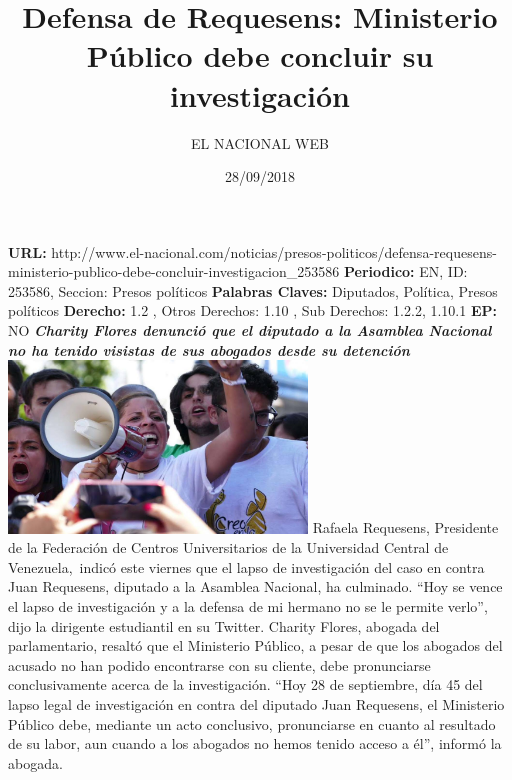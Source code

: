 \documentclass{article}%
\title{\textbf{Defensa de Requesens: Ministerio Público debe concluir su investigación}}%
\author{EL NACIONAL WEB}%
\date{28/09/2018}%
\begin{document}
%
\normalsize%
\maketitle%
\textbf{URL: }%
http://www.el{-}nacional.com/noticias/presos{-}politicos/defensa{-}requesens{-}ministerio{-}publico{-}debe{-}concluir{-}investigacion\_253586\newline%
%
\textbf{Periodico: }%
EN, %
ID: %
253586, %
Seccion: %
Presos políticos\newline%
%
\textbf{Palabras Claves: }%
Diputados, Política, Presos políticos\newline%
%
\textbf{Derecho: }%
1.2%
, Otros Derechos: %
1.10%
, Sub Derechos: %
1.2.2, 1.10.1%
\newline%
%
\textbf{EP: }%
NO\newline%
\newline%
%
\textbf{\textit{Charity Flores denunció que el diputado a la Asamblea Nacional no ha tenido visistas de sus abogados desde su detención}}%
\newline%
\newline%
%
\includegraphics[width=300px]{84.jpg}%
\newline%
%
Rafaela Requesens, Presidente de la Federación de Centros Universitarios de la Universidad Central de Venezuela,~indicó este viernes que el lapso de investigación del caso en contra Juan Requesens, diputado a la Asamblea Nacional, ha culminado.%
\newline%
%
“Hoy se vence el lapso de investigación y a la defensa de mi hermano no se le permite verlo”, dijo la dirigente estudiantil en su Twitter.%
\newline%
%
Charity Flores, abogada del parlamentario, resaltó que el Ministerio Público, a pesar de que los abogados del acusado no han podido encontrarse con su cliente, debe pronunciarse conclusivamente acerca de la investigación.%
\newline%
%
“Hoy 28 de septiembre, día 45 del lapso legal de investigación en contra del diputado Juan Requesens, el Ministerio Público debe, mediante un acto conclusivo, pronunciarse en cuanto al resultado de su labor, aun cuando a los abogados no hemos tenido acceso a él”, informó la abogada.%
\newline%
%
\end{document}
